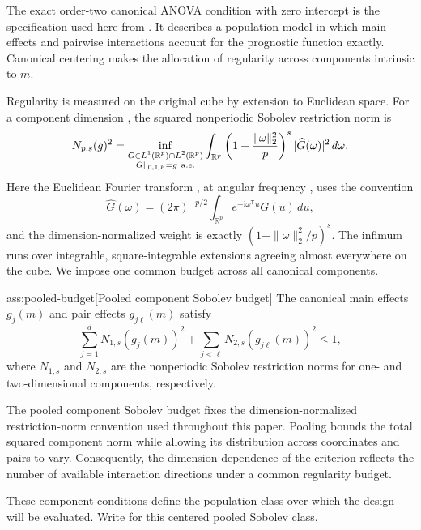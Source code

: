 The exact order-two canonical ANOVA condition with zero intercept is the specification used here from \citep{Cytrynbaum2026Limits}. It describes a population model in which main effects and pairwise interactions account for the prognostic function exactly. Canonical centering makes the allocation of regularity across components intrinsic to \(m\).

Regularity is measured on the original cube by extension to Euclidean space. For a component dimension , the squared nonperiodic Sobolev restriction norm  is
\[
N_{p,s}(g)^2
=
\inf_{\substack{G\in L^1(\mathbb R^p)\cap L^2(\mathbb R^p)\\
G|_{[0,1]^p}=g\ {\rm a.e.}}}
\int_{\mathbb R^p}
\left(1+\frac{\|\omega\|_2^2}{p}\right)^s
|\widehat G(\omega)|^2\,d\omega.
\]
Here the Euclidean Fourier transform , at angular frequency , uses the convention
\[
\widehat G(\omega)
=(2\pi)^{-p/2}\int_{\mathbb R^p}
e^{-\mathrm i\omega^{\mathsf T}u}G(u)\,du,
\]
and the dimension-normalized weight is exactly \((1+\|\omega\|_2^2/p)^s\). The infimum runs over integrable, square-integrable extensions agreeing almost everywhere on the cube. We impose one common budget across all canonical components.

\begin{assumptionv}{ass:pooled-budget}[Pooled component Sobolev budget]
The canonical main effects \(g_j(m)\) and pair effects \(g_{j\ell}(m)\) satisfy
\[
\sum_{j=1}^d N_{1,s}(g_j(m))^2
+\sum_{j<\ell}N_{2,s}(g_{j\ell}(m))^2
\leq 1,
\]
where \(N_{1,s}\) and \(N_{2,s}\) are the nonperiodic Sobolev restriction norms for one- and two-dimensional components, respectively.
\end{assumptionv}

The pooled component Sobolev budget fixes the dimension-normalized restriction-norm convention used throughout this paper. Pooling bounds the total squared component norm while allowing its distribution across coordinates and pairs to vary. Consequently, the dimension dependence of the criterion reflects the number of available interaction directions under a common regularity budget.

These component conditions define the population class over which the design will be evaluated. Write  for this centered pooled Sobolev class.

